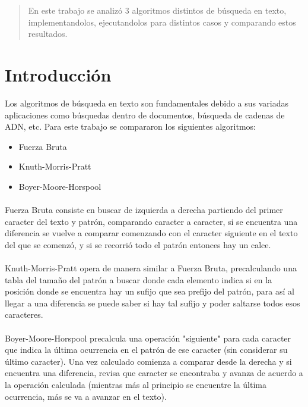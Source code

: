 \documentclass[14pt,letterpaper,hidelinks]{extarticle}
\begin{document}
\renewcommand{\sectionmark}[1]{\markright{\thesection.\ #1}}
\renewcommand{\headrulewidth}{0.5pt}

%

\begin{abstract}
   En este trabajo se analizó 3 algoritmos distintos de búsqueda en texto, implementandolos,
	 ejecutandolos para distintos casos y comparando estos resultados.
\end{abstract}
\section{Introducción}
	Los algoritmos de búsqueda en texto son fundamentales debido a sus variadas aplicaciones como búsquedas dentro de documentos,
	búsqueda de cadenas de ADN, etc. Para este trabajo se compararon los siguientes algoritmos:
	\begin{itemize}
			\item Fuerza Bruta
			\item Knuth-Morris-Pratt
			\item Boyer-Moore-Horspool
	\end{itemize}
	\paragraph{} Fuerza Bruta consiste en buscar de izquierda a derecha partiendo del primer caracter del texto y patrón, comparando caracter a
	caracter, si se encuentra una diferencia se vuelve a comparar comenzando con el caracter siguiente en el texto del que se comenzó, y si
	se recorrió todo el patrón entonces hay un calce.
	\paragraph{} Knuth-Morris-Pratt opera de manera similar a Fuerza Bruta, precalculando una tabla del tamaño del patrón a buscar donde
	cada elemento indica si en la posición donde se encuentra hay un sufijo que sea prefijo del patrón, para así al llegar
	a una diferencia se puede saber si hay tal sufijo y poder saltarse todos esos caracteres.
	\paragraph{} Boyer-Moore-Horspool precalcula una operación "siguiente" para cada caracter que indica la última ocurrencia en el patrón
	de ese caracter (sin considerar su último caracter). Una vez calculado comienza a comparar desde la derecha y si encuentra una diferencia,
	revisa que caracter se encontraba y avanza de acuerdo a la operación calculada (mientras más al principio se encuentre la última ocurrencia,
	más se va a avanzar en el texto).
\end{document}
